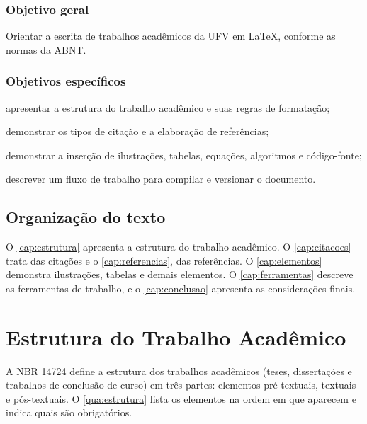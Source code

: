 \documentclass[
	12pt, %
	openright, %
	oneside, %
	a4paper, %
	sumario=tradicional, %
	english, %
	brazil, %
]{abntex2}
\begin{document}
\subsection{Objetivo geral}\label{sec:objetivo-geral}

Orientar a escrita de trabalhos acadêmicos da UFV em \LaTeX, conforme as normas da ABNT.

\subsection{Objetivos específicos}\label{sec:objetivos-especificos}

\begin{alineas}
	\item apresentar a estrutura do trabalho acadêmico e suas regras de formatação;
	\item demonstrar os tipos de citação e a elaboração de referências;
	\item demonstrar a inserção de ilustrações, tabelas, equações, algoritmos e código-fonte;
	\item descrever um fluxo de trabalho para compilar e versionar o documento.
\end{alineas}

\section{Organização do texto}\label{sec:organizacao}

O \autoref{cap:estrutura} apresenta a estrutura do trabalho acadêmico. O \autoref{cap:citacoes} trata das citações e o \autoref{cap:referencias}, das referências. O \autoref{cap:elementos} demonstra ilustrações, tabelas e demais elementos. O \autoref{cap:ferramentas} descreve as ferramentas de trabalho, e o \autoref{cap:conclusao} apresenta as considerações finais.
\chapter{Estrutura do Trabalho Acadêmico}\label{cap:estrutura}

A NBR 14724 \cite{abnt14724} define a estrutura dos trabalhos acadêmicos (teses, dissertações e trabalhos de conclusão de curso) em três partes: elementos pré-textuais, textuais e pós-textuais. O \autoref{qua:estrutura} lista os elementos na ordem em que aparecem e indica quais são obrigatórios.
\end{document}
